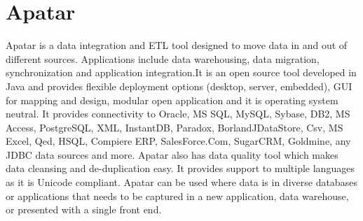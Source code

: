 \section{Apatar}
Apatar \cite{ hid-sp18-402-www-apatar } is a data integration and ETL
tool designed to move data in and out of different
sources. Applications include data warehousing, data migration,
synchronization and application integration.It is an open source tool
developed in Java and provides flexible deployment options (desktop,
server, embedded), GUI for mapping and design, modular open
application and it is operating system neutral. It provides
connectivity to Oracle, MS SQL, MySQL, Sybase, DB2, MS Access,
PostgreSQL, XML, InstantDB, Paradox, BorlandJDataStore, Csv, MS Excel,
Qed, HSQL, Compiere ERP, SalesForce.Com, SugarCRM, Goldmine, any JDBC
data sources and more. Apatar also has data quality tool which makes
data cleansing and de-duplication easy. It provides support to
multiple languages as it is Unicode compliant. Apatar can be used
where data is in diverse databases or applications that needs to be
captured in a new application, data warehouse, or presented with a
single front end.

